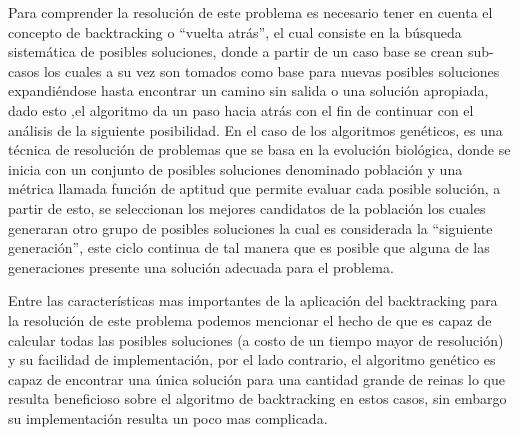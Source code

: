 \documentclass[12pt,a4paper]{article}
\begin{document}
	Para comprender la resolución de este problema es necesario tener en cuenta el concepto de backtracking o “vuelta atrás”, el cual consiste en la búsqueda sistemática de posibles soluciones, donde a partir de un caso base se crean sub-casos  los cuales a su vez son tomados como base para nuevas posibles soluciones expandiéndose hasta encontrar un camino sin salida o una solución apropiada, dado esto ,el algoritmo da un paso hacia atrás con el fin de continuar con el análisis de la siguiente posibilidad. En el caso de los algoritmos genéticos, es una técnica de resolución de problemas que se basa en la evolución biológica, donde se inicia con un conjunto de posibles soluciones denominado población y una métrica llamada función de aptitud que permite evaluar cada posible solución, a partir de esto, se seleccionan los mejores candidatos de la población los cuales generaran otro grupo de posibles soluciones la cual es considerada la “siguiente generación”, este ciclo continua de tal manera que es posible que alguna de las generaciones presente una solución adecuada para el problema.  

	Entre las características mas importantes de la aplicación del backtracking para la resolución de este problema podemos mencionar el hecho de que es capaz de calcular todas las posibles soluciones (a costo de un tiempo mayor de resolución) y su facilidad de implementación, por el lado contrario, el algoritmo genético es capaz de encontrar una única solución  para una cantidad grande de reinas lo que resulta beneficioso sobre el algoritmo de backtracking en estos casos, sin embargo su implementación resulta un poco mas complicada.
\bigskip
\bigskip 


\pagebreak
\end{document}
